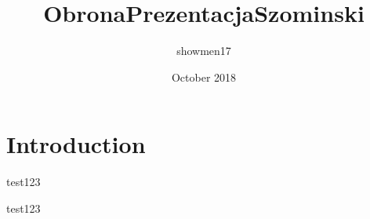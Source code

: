 \documentclass{article}
\title{ObronaPrezentacjaSzominski}
\author{showmen17 }
\date{October 2018}
\begin{document}
\maketitle

\section{Introduction}

test123

test123
\end{document}
